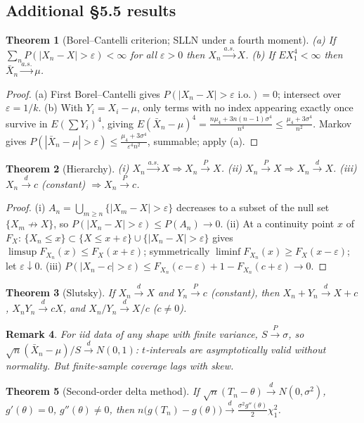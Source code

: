 \documentclass[11pt]{article}
\newtheorem{theorem}{Theorem}[section]
\newtheorem{remark}[theorem]{Remark}
\newcommand{\convP}{\xrightarrow{P}}\newcommand{\convD}{\xrightarrow{d}}\newcommand{\convAS}{\xrightarrow{a.s.}}
\begin{document}
\subsection*{Additional \S5.5 results}
\begin{theorem}[Borel--Cantelli criterion; SLLN under a fourth moment]
(a) If $\sum_nP(|X_n-X|>\varepsilon)<\infty$ for all $\varepsilon>0$ then $X_n\convAS X$. (b) If $EX_1^4<\infty$ then $\bar X_n\convAS\mu$.
\end{theorem}
\begin{proof}
(a) First Borel--Cantelli gives $P(|X_n-X|>\varepsilon\text{ i.o.})=0$; intersect over $\varepsilon=1/k$. (b) With $Y_i=X_i-\mu$, only terms with no index appearing exactly once survive in $E(\sum Y_i)^4$, giving $E(\bar X_n-\mu)^4=\frac{n\mu_4+3n(n-1)\sigma^4}{n^4}\le\frac{\mu_4+3\sigma^4}{n^2}$. Markov gives $P(|\bar X_n-\mu|>\varepsilon)\le\frac{\mu_4+3\sigma^4}{\varepsilon^4n^2}$, summable; apply (a).
\end{proof}
\begin{theorem}[Hierarchy]
(i) $X_n\convAS X\Rightarrow X_n\convP X$. (ii) $X_n\convP X\Rightarrow X_n\convD X$. (iii) $X_n\convD c$ (constant) $\Rightarrow X_n\convP c$.
\end{theorem}
\begin{proof}
(i) $A_n=\bigcup_{m\ge n}\{|X_m-X|>\varepsilon\}$ decreases to a subset of the null set $\{X_m\not\to X\}$, so $P(|X_n-X|>\varepsilon)\le P(A_n)\to0$. (ii) At a continuity point $x$ of $F_X$: $\{X_n\le x\}\subset\{X\le x+\varepsilon\}\cup\{|X_n-X|>\varepsilon\}$ gives $\limsup F_{X_n}(x)\le F_X(x+\varepsilon)$; symmetrically $\liminf F_{X_n}(x)\ge F_X(x-\varepsilon)$; let $\varepsilon\downarrow0$. (iii) $P(|X_n-c|>\varepsilon)\le F_{X_n}(c-\varepsilon)+1-F_{X_n}(c+\varepsilon)\to0$.
\end{proof}
\begin{theorem}[Slutsky]
If $X_n\convD X$ and $Y_n\convP c$ (constant), then $X_n+Y_n\convD X+c$, $X_nY_n\convD cX$, and $X_n/Y_n\convD X/c$ ($c\ne0$).
\end{theorem}
\begin{remark}
For iid data of any shape with finite variance, $S\convP\sigma$, so $\sqrt n(\bar X_n-\mu)/S\convD N(0,1)$: $t$-intervals are asymptotically valid without normality. But finite-sample coverage lags with skew.
\end{remark}
\begin{theorem}[Second-order delta method]
If $\sqrt n(T_n-\theta)\convD N(0,\sigma^2)$, $g'(\theta)=0$, $g''(\theta)\ne0$, then $n\big(g(T_n)-g(\theta)\big)\convD\frac{\sigma^2g''(\theta)}{2}\chi^2_1$.
\end{theorem}
\end{document}
